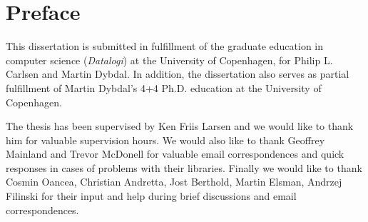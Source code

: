 \chapter{Preface}
This dissertation is submitted in fulfillment of the graduate education
in computer science (\textit{Datalogi}) at the University of
Copenhagen, for Philip L. Carlsen and Martin Dybdal. In addition, the
dissertation also serves as partial fulfillment of Martin Dybdal's 4+4
Ph.D. education at the University of Copenhagen.

The thesis has been supervised by Ken Friis Larsen and we would like
to thank him for valuable supervision hours. We would
also like to thank Geoffrey Mainland and Trevor McDonell for valuable
email correspondences and quick responses in cases of problems with
their libraries. Finally we would like to thank Cosmin Oancea,
Christian Andretta, Jost Berthold, Martin Elsman, Andrzej Filinski for
their input and help during brief discussions and email
correspondences.


